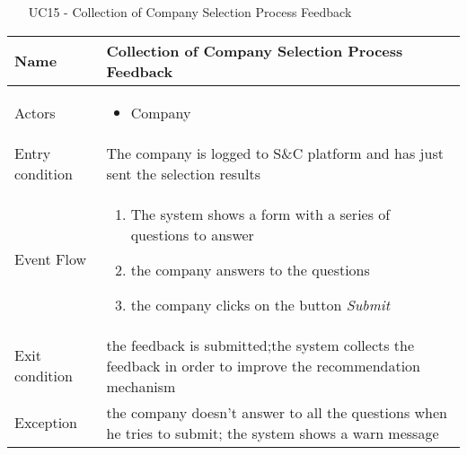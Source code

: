 				\begin{table} [H]
					\centering
					\begin{itemize}
						\item [UC15] - Collection of Company Selection Process Feedback
					\end{itemize}
					
					\begin{tabular}{|| P{7.5cm} | P{7.5cm} ||}
						\hline
						Name & Collection of Company Selection Process Feedback \\
						\hline
						Actors & \parbox{5cm}{\begin{itemize}
								\item Company
							\end{itemize}
						} \\
						\hline
						Entry condition & The company is logged to S\&C platform and has just sent the selection results \\
						\hline
						Event Flow & \parbox{5cm}{\begin{enumerate}
								\item The system shows a form with a series of questions to answer 
								\item the company answers to the questions
								\item the company clicks on the button \textit{Submit}
						\end{enumerate}} \\
						\hline 
						Exit condition & the feedback is submitted;the system collects the
						feedback in order to improve the recommendation
						mechanism \\
						\hline
						Exception & the company doesn't answer to all the questions when he tries to submit; the system shows a warn message \\
						\hline
					\end{tabular}
				\end{table}
				
